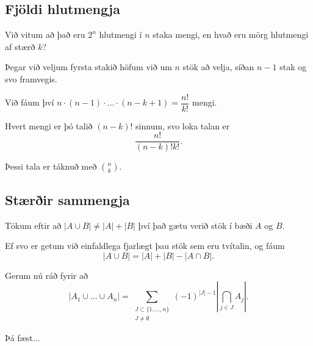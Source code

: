\subsection{Fjöldi hlutmengja}
{
    {
        \item<1-> Við vitum að það eru $2^n$ hlutmengi í $n$ staka mengi, en hvað eru mörg hlutmengi af stærð $k$?
        \item<2-> Þegar við veljum fyrsta stakið höfum við um $n$ stök að velja, síðan $n - 1$ stak og svo framvegis.
        \item<3-> Við fáum því $n \cdot (n - 1) \cdot ... \cdot (n - k + 1) = \dfrac{n!}{k!}$ mengi.
        \item<4-> Hvert mengi er þó talið $(n - k)!$ sinnum, svo loka talan er
        \[
            \frac{n!}{(n - k)!k!}.
        \]
        \item<5-> Þessi tala er táknuð með ${n \choose k}$.
    }
}

\subsection{Stærðir sammengja}
{
    {
        \item<1-> Tökum eftir að $|A \cup B| \neq |A| + |B|$ því það gætu verið stök í bæði $A$ og $B$.
        \item<2-> Ef svo er getum við einfaldlega fjarlægt þau stök sem eru tvítalin, og fáum
        \[
            |A \cup B| = |A| + |B| - |A \cap B|.
        \]
        \item<3-> Gerum nú ráð fyrir að
        \[
            |A_1 \cup ... \cup A_n|
            =
            \sum_{\substack{J \subset \{1, ..., n\} \\ J \neq \emptyset}} (-1)^{|J| - 1} \left | \bigcap_{j \in J} A_j \right |.
        \]
        \item<4-> Þá fæst...
    }
}

